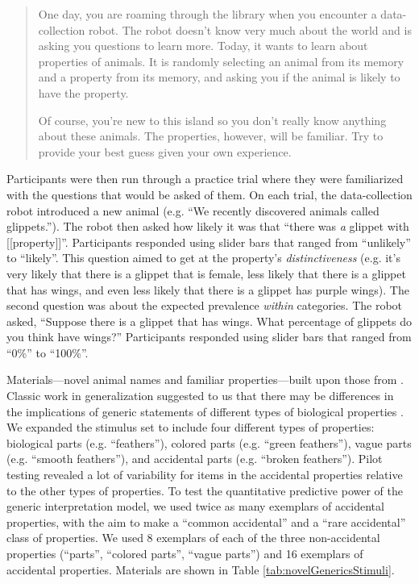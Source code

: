 \documentclass[10pt,letterpaper]{article}
\begin{document}
\begin{quote}
One day, you are roaming through the library when you encounter a data-collection robot. The robot doesn't know very much about the world and is asking you questions to learn more. Today, it wants to learn about properties of animals. It is randomly selecting an animal from its memory and a property from its memory, and asking you if the animal is likely to have the property.

Of course, you're new to this island so you don't really know anything about these animals. The properties, however, will be familiar. Try to provide your best guess given your own experience.
\end{quote}

Participants were then run through a practice trial where they were familiarized with the questions that would be asked of them. 
On each trial, the data-collection robot introduced a new animal (e.g. ``We recently discovered animals called glippets.''). 
The robot then asked how likely it was that ``there was \emph{a} glippet with [[property]]''. 
Participants responded using slider bars that ranged from ``unlikely'' to ``likely''.
This question aimed to get at the property's \emph{distinctiveness}
(e.g. it's very likely that there is a glippet that is female, less likely that there is a glippet that has wings, and even less likely that there is a glippet has purple wings). 
The second question was about the expected prevalence \emph{within} categories. 
The robot asked, ``Suppose there is a glippet that has wings. What percentage of glippets do you think have wings?'' Participants responded using slider bars that ranged from ``0\%'' to ``100\%''.


Materials---novel animal names and familiar properties---built upon those from . 
Classic work in generalization suggested to us that there may be differences in the implications of generic statements of different types of biological properties \cite{Nisbett1983}. 
We expanded the stimulus set to include four different types of properties: biological parts (e.g. ``feathers''), colored parts (e.g. ``green feathers''), vague parts (e.g. ``smooth feathers''), and accidental parts (e.g. ``broken feathers''). 
Pilot testing revealed a lot of variability for items in the accidental properties relative to the other types of properties. 
To test the quantitative predictive power of the generic interpretation model, we used twice as many exemplars of accidental properties, with the aim to make a ``common accidental'' and a ``rare accidental'' class of properties. 
We used 8 exemplars of each of the three non-accidental properties (``parts'', ``colored parts'', ``vague parts'') and 16 exemplars of accidental properties.
Materials are shown in Table \ref{tab:novelGenericsStimuli}.
\end{document}
